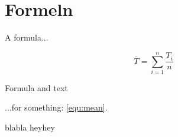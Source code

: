 \documentclass[a4paper,10pt]{scrartcl}
\begin{document}
\section{Formeln}
A formula...
\begin{formel}
\[
\overline{T}=\sum_{i=1}^{n}\frac{T_i}{n}
\]
\label{equ:mean}
\caption{Formula and text}
\end{formel}
...for something: \ref{equ:mean}.

\printindex

\listoffigures

\listoftables



\begin{thebibliography}{99}
	 blabla
	 heyhey


\end{thebibliography}
\end{document}
